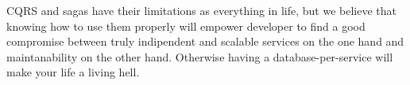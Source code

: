 \documentclass[conference]{IEEEtran}
\begin{document}
CQRS and sagas have their limitations as everything in life, but we believe that knowing how to use them properly will empower developer to find a good compromise between truly indipendent and scalable services on the one hand and maintanability on the other hand. Otherwise having a database-per-service will make your life a living hell.








\end{document}

